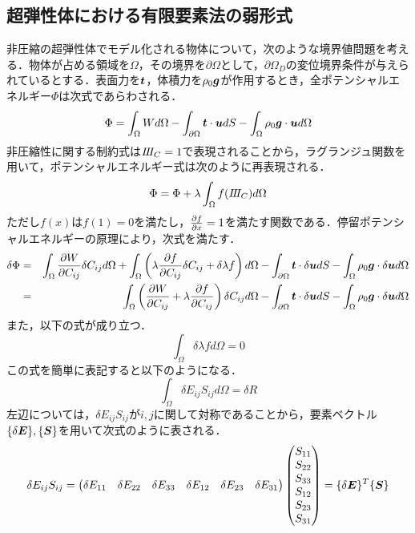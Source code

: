 \subsection{超弾性体における有限要素法の弱形式}
非圧縮の超弾性体でモデル化される物体について，次のような境界値問題を考える．物体が占める領域を$ \Omega $，その境界を$ \partial \Omega $として，$ \partial \Omega_D $の変位境界条件が与えられているとする．表面力を$ {\mbox{\boldmath $t$}} $，体積力を$ \rho_0 {\mbox{\boldmath $g$}} $が作用するとき，全ポテンシャルエネルギー$ \Phi $は次式であらわされる．
\begin{equation}\label{eq:PotentialEq}
	\Phi = \int_{\Omega} W d\Omega - \int_{\partial \Omega} {\mbox{\boldmath $t$}} \cdot {\mbox{\boldmath $u$}} dS - \int_{\Omega} \rho_0{\mbox{\boldmath $g$}} \cdot {\mbox{\boldmath $u$}} d\Omega
\end{equation}
非圧縮性に関する制約式は$ I\hspace{-.2em}I\hspace{-.2em}I_C = 1 $で表現されることから，ラグランジュ関数を用いて，ポテンシャルエネルギー式は次のように再表現される．
\begin{equation}\label{eq:PotentialReEq}
	\Phi = \Phi + \lambda \int_{\Omega} f(I\hspace{-.2em}I\hspace{-.2em}I_C) d\Omega
\end{equation}
ただし$ f(x) $は$ f(1)=0 $を満たし，$ \frac{\partial f}{\partial x}=1 $を満たす関数である．停留ポテンシャルエネルギーの原理により，次式を満たす．
\begin{eqnarray}\label{eq:DeltaPotentialEq}
	\delta \Phi &=& \int_{\Omega} \frac{\partial W}{\partial C_{ij}} \delta C_{ij} d\Omega + \int_{\Omega} \left( \lambda \frac{\partial f}{\partial C_{ij}} \delta C_{ij} + \delta \lambda f \right)d \Omega -\int_{\partial \Omega} {\mbox{\boldmath $t$}}\cdot \delta {\mbox{\boldmath $u$}} dS - \int_{\Omega} \rho_0 {\mbox{\boldmath $g$}} \cdot \delta {\mbox{\boldmath $u$}} d\Omega \\
	&=& \int_{\Omega} \left( \frac{\partial W}{\partial C_{ij}} + \lambda \frac{\partial f}{\partial C_{ij}}\right) \delta C_{ij} d\Omega -  \int_{\partial \Omega} {\mbox{\boldmath $t$}} \cdot \delta {\mbox{\boldmath $u$}} dS - \int_{\Omega} \rho_0{\mbox{\boldmath $g$}} \cdot \delta {\mbox{\boldmath $u$}} d\Omega
\end{eqnarray}
また，以下の式が成り立つ．
\begin{equation}\label{eq:ConstraintEq}
	\int_{\Omega} \delta \lambda f d\Omega =0
\end{equation}
この式を簡単に表記すると以下のようになる．
\begin{equation}\label{eq:SimplyPotential}
	\int_{\Omega} \delta E_{ij} S_{ij} d\Omega = \delta R
\end{equation}
左辺については，$ \delta E_{ij} S_{ij} $が$ i,j $に関して対称であることから，要素ベクトル$ \{\delta {\mbox{\boldmath $E$}} \},\{{\mbox{\boldmath $S$}} \} $を用いて次式のように表される．
\begin{equation}\label{eq:Tensor_to_Vector}
	\delta E_{ij} S_{ij} = \begin{pmatrix} \delta E_{11}&\delta E_{22} & \delta E_{33} & \delta E_{12} & \delta E_{23} & \delta E_{31}  \end{pmatrix} \begin{pmatrix} S_{11}\\S_{22} \\ S_{33} \\ S_{12} \\ S_{23} \\ S_{31}  \end{pmatrix} = \{\delta {\mbox{\boldmath $E$}} \}^T \{{\mbox{\boldmath $S$}} \}
\end{equation}
